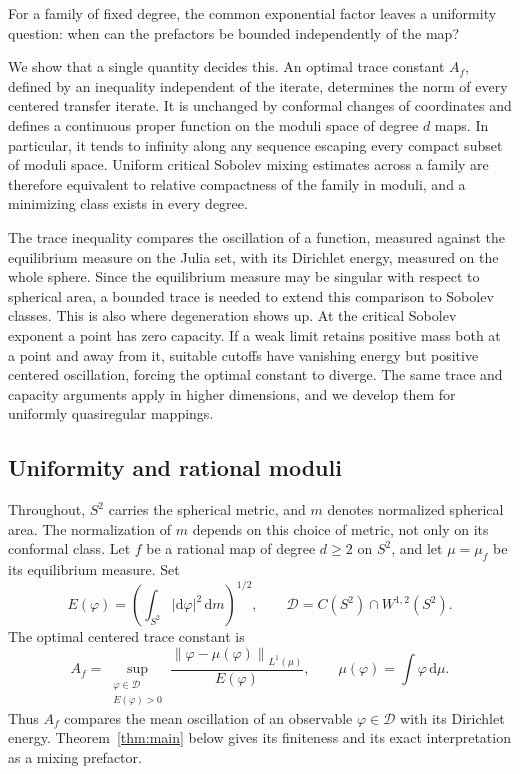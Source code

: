 \documentclass[11pt,reqno]{amsart}
\theoremstyle{plain}
\theoremstyle{definition}
\theoremstyle{remark}
\newcommand{\E}{\mathbb E}
\newcommand{\Dcal}{\mathcal D}
\newcommand{\norm}[1]{\left\lVert #1\right\rVert}
\newcommand{\dd}{\mathrm d}
\numberwithin{equation}{section}
\begin{document}
For a family of fixed degree, the common exponential factor leaves a uniformity question: when can the prefactors be bounded independently of the map?

We show that a single quantity decides this. An optimal trace constant $A_f$, defined by an inequality independent of the iterate, determines the norm of every centered transfer iterate. It is unchanged by conformal changes of coordinates and defines a continuous proper function on the moduli space of degree $d$ maps. In particular, it tends to infinity along any sequence escaping every compact subset of moduli space. Uniform critical Sobolev mixing estimates across a family are therefore equivalent to relative compactness of the family in moduli, and a minimizing class exists in every degree.

The trace inequality compares the oscillation of a function, measured against the equilibrium measure on the Julia set, with its Dirichlet energy, measured on the whole sphere. Since the equilibrium measure may be singular with respect to spherical area, a bounded trace is needed to extend this comparison to Sobolev classes. This is also where degeneration shows up. At the critical Sobolev exponent a point has zero capacity. If a weak limit retains positive mass both at a point and away from it, suitable cutoffs have vanishing energy but positive centered oscillation, forcing the optimal constant to diverge. The same trace and capacity arguments apply in higher dimensions, and we develop them for uniformly quasiregular mappings.

\subsection{Uniformity and rational moduli}

Throughout, $S^2$ carries the spherical metric, and $m$ denotes normalized spherical area. The normalization of $m$ depends on this choice of metric, not only on its conformal class. Let $f$ be a rational map of degree $d\ge2$ on $S^2$, and let $\mu=\mu_f$ be its equilibrium measure. Set
\begin{equation}\label{eq:rational-energy}
 E(\varphi)=\left(\int_{S^2}|\dd\varphi|^2\,\dd m\right)^{1/2},
 \qquad \Dcal=C(S^2)\cap W^{1,2}(S^2).
\end{equation}
The optimal centered trace constant is
\begin{equation}\label{eq:optimal-trace}
 A_f=\sup_{\substack{\varphi\in\Dcal\\E(\varphi)>0}}
 \frac{\norm{\varphi-\mu(\varphi)}_{L^1(\mu)}}{E(\varphi)},
 \qquad \mu(\varphi)=\int\varphi\,\dd\mu.
\end{equation}
Thus $A_f$ compares the mean oscillation of an observable $\varphi\in\Dcal$ with its Dirichlet energy. Theorem~\ref{thm:main} below gives its finiteness and its exact interpretation as a mixing prefactor.
\end{document}
